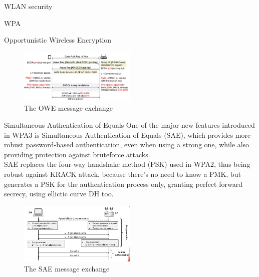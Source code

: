 \begin{section}{WLAN security}
\begin{subsection}{WPA}
\begin{subsubsection}{Opportunistic Wireless Encryption}
      \begin{figure}[h]
        \centering
        \includegraphics[width=0.5\textwidth]{img/wireless/owe.png}
        \caption{The OWE message exchange}
      \end{figure}

    \end{subsubsection}
    \begin{subsubsection}{Simultaneous Authentication of Equals}
      One of the major new features introduced in WPA3 is Simultaneous Authentication of Equals (SAE),
      which provides more robust password-based authentication, even when using a strong one, while 
      also providing protection against bruteforce attacks.\\
      SAE replaces the four-way handshake method (PSK) used in WPA2, thus being robust against 
      KRACK attack, because there's no need to know a PMK, but generates a PSK for the authentication
      process only, granting perfect forward secrecy, using ellictic curve DH too.\\
      \begin{figure}[h]
        \centering
        \includegraphics[width=0.5\textwidth]{img/wireless/sae.png}
        \caption{The SAE message exchange}
      \end{figure}
    \end{subsubsection}

  \end{subsection}

\end{section}

